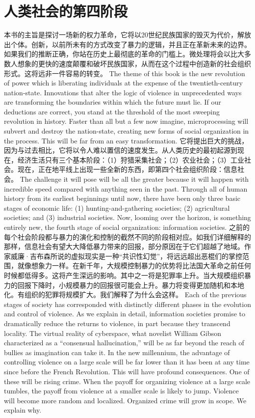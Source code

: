 \section{人类社会的第四阶段}
\begin{paracol}{2}[]
本书的主旨是探讨一场新的权力革命，它将以20世纪民族国家的毁灭为代价，解放出个体。创新，以前所未有的方式改变了暴力的逻辑，并且正在革新未来的边界。如果我们的推断正确，你站在历史上最彻底的革命的门槛上。微处理将会以比大多数人想象的更快的速度颠覆和破坏民族国家，从而在这个过程中创造新的社会组织形式。这将远非一件容易的转变。
\switchcolumn
The theme of this book is the new revolution of power which is liberating individuals at the expense of the twentieth-century nation-state. Innovations that alter the logic of violence in unprecedented ways are transforming the boundaries within which the future must lie. If our deductions are correct, you stand at the threshold of the most sweeping revolution in history. Faster than all but a few now imagine, microprocessing will subvert and destroy the nation-state, creating new forms of social organization in the process. This will be far from an easy transformation.
\switchcolumn*
它将提出巨大的挑战，因为与过去相比，它将以令人难以置信的速度发生。从人类历史的最初起源到现在，经济生活只有三个基本阶段：（1）狩猎采集社会；（2）农业社会；（3）工业社会。现在，正在地平线上出现一些全新的东西，即第四个社会组织阶段：信息社会。
\switchcolumn
The challenge it will pose will be all the greater because it will happen with incredible speed compared with anything seen in the past. Through all of human history from its earliest beginnings until now, there have been only three basic stages of economic life: (1) hunting-and-gathering societies; (2) agricultural societies; and (3) industrial societies. Now, looming over the horizon, is something entirely new, the fourth stage of social organization: information societies.
\switchcolumn*
之前的每个社会阶段都与暴力的演化和控制的截然不同的阶段相对应。如我们详细解释的那样，信息社会有望大大降低暴力带来的回报，部分原因在于它们超越了地域。作家威廉·吉布森所说的虚拟现实是一种“共识性幻觉”，将远远超出恶棍们的掌控范围，就像想象力一样。在新千年，大规模控制暴力的优势将比法国大革命之前任何时候都低得多。这将产生深远的影响。其中之一将是犯罪率上升。当大规模组织暴力的回报下降时，小规模暴力的回报很可能会上升。暴力将变得更加随机和本地化。有组织的犯罪将规模扩大。我们解释了为什么会这样。
\switchcolumn
Each of the previous stages of society has corresponded with distinctly different phases in the evolution and control of violence. As we explain in detail, information societies promise to dramatically reduce the returns to violence, in part because they transcend locality. The virtual reality of cyberspace, what novelist William Gibson characterized as a ``consensual hallucination,'' will be as far beyond the reach of bullies as imagination can take it. In the new millennium, the advantage of controlling violence on a large scale will be far lower than it has been at any time since before the French Revolution. This will have profound consequences. One of these will be rising crime. When the payoff for organizing violence at a large scale tumbles, the payoff from violence at a smaller scale is likely to jump. Violence will become more random and localized. Organized crime will grow in scope. We explain why.

\end{paracol}
